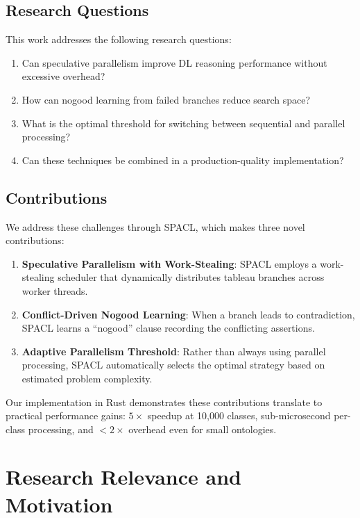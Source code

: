 \documentclass[preprint,12pt]{elsarticle}
\begin{document}
\subsection{Research Questions}
\label{sec:questions}

This work addresses the following research questions:

\begin{enumerate}
    \item[RQ1:] Can speculative parallelism improve DL reasoning performance without excessive overhead?
    \item[RQ2:] How can nogood learning from failed branches reduce search space?
    \item[RQ3:] What is the optimal threshold for switching between sequential and parallel processing?
    \item[RQ4:] Can these techniques be combined in a production-quality implementation?
\end{enumerate}

\subsection{Contributions}
\label{sec:contributions}

We address these challenges through SPACL, which makes three novel contributions:

\begin{enumerate}
    \item[C1:] \textbf{Speculative Parallelism with Work-Stealing}: SPACL employs a work-stealing scheduler that dynamically distributes tableau branches across worker threads.
    
    \item[C2:] \textbf{Conflict-Driven Nogood Learning}: When a branch leads to contradiction, SPACL learns a ``nogood'' clause recording the conflicting assertions.
    
    \item[C3:] \textbf{Adaptive Parallelism Threshold}: Rather than always using parallel processing, SPACL automatically selects the optimal strategy based on estimated problem complexity.
\end{enumerate}

Our implementation in Rust demonstrates these contributions translate to practical performance gains: $5\times$ speedup at 10,000 classes, sub-microsecond per-class processing, and $<2\times$ overhead even for small ontologies.

\section{Research Relevance and Motivation}
\label{sec:related}
\end{document}
